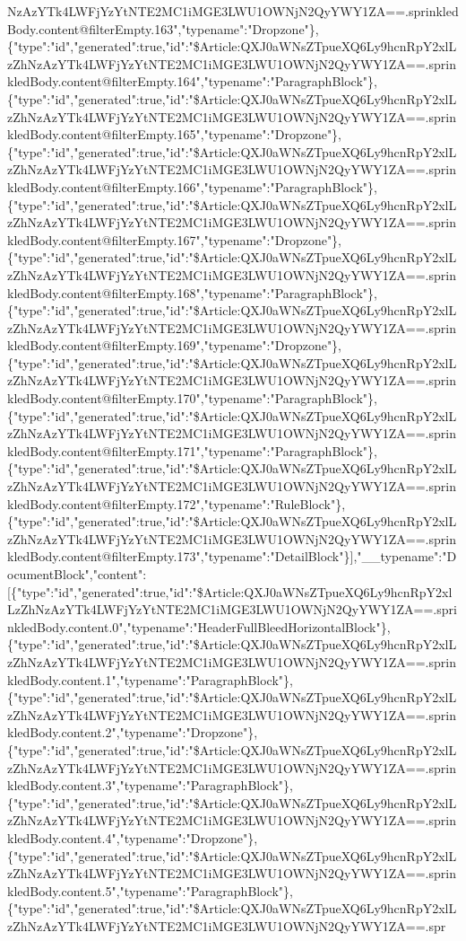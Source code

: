 NzAzYTk4LWFjYzYtNTE2MC1iMGE3LWU1OWNjN2QyYWY1ZA==.sprinkledBody.content@filterEmpty.163","typename":"Dropzone"\},\{"type":"id","generated":true,"id":"\$Article:QXJ0aWNsZTpueXQ6Ly9hcnRpY2xlLzZhNzAzYTk4LWFjYzYtNTE2MC1iMGE3LWU1OWNjN2QyYWY1ZA==.sprinkledBody.content@filterEmpty.164","typename":"ParagraphBlock"\},\{"type":"id","generated":true,"id":"\$Article:QXJ0aWNsZTpueXQ6Ly9hcnRpY2xlLzZhNzAzYTk4LWFjYzYtNTE2MC1iMGE3LWU1OWNjN2QyYWY1ZA==.sprinkledBody.content@filterEmpty.165","typename":"Dropzone"\},\{"type":"id","generated":true,"id":"\$Article:QXJ0aWNsZTpueXQ6Ly9hcnRpY2xlLzZhNzAzYTk4LWFjYzYtNTE2MC1iMGE3LWU1OWNjN2QyYWY1ZA==.sprinkledBody.content@filterEmpty.166","typename":"ParagraphBlock"\},\{"type":"id","generated":true,"id":"\$Article:QXJ0aWNsZTpueXQ6Ly9hcnRpY2xlLzZhNzAzYTk4LWFjYzYtNTE2MC1iMGE3LWU1OWNjN2QyYWY1ZA==.sprinkledBody.content@filterEmpty.167","typename":"Dropzone"\},\{"type":"id","generated":true,"id":"\$Article:QXJ0aWNsZTpueXQ6Ly9hcnRpY2xlLzZhNzAzYTk4LWFjYzYtNTE2MC1iMGE3LWU1OWNjN2QyYWY1ZA==.sprinkledBody.content@filterEmpty.168","typename":"ParagraphBlock"\},\{"type":"id","generated":true,"id":"\$Article:QXJ0aWNsZTpueXQ6Ly9hcnRpY2xlLzZhNzAzYTk4LWFjYzYtNTE2MC1iMGE3LWU1OWNjN2QyYWY1ZA==.sprinkledBody.content@filterEmpty.169","typename":"Dropzone"\},\{"type":"id","generated":true,"id":"\$Article:QXJ0aWNsZTpueXQ6Ly9hcnRpY2xlLzZhNzAzYTk4LWFjYzYtNTE2MC1iMGE3LWU1OWNjN2QyYWY1ZA==.sprinkledBody.content@filterEmpty.170","typename":"ParagraphBlock"\},\{"type":"id","generated":true,"id":"\$Article:QXJ0aWNsZTpueXQ6Ly9hcnRpY2xlLzZhNzAzYTk4LWFjYzYtNTE2MC1iMGE3LWU1OWNjN2QyYWY1ZA==.sprinkledBody.content@filterEmpty.171","typename":"ParagraphBlock"\},\{"type":"id","generated":true,"id":"\$Article:QXJ0aWNsZTpueXQ6Ly9hcnRpY2xlLzZhNzAzYTk4LWFjYzYtNTE2MC1iMGE3LWU1OWNjN2QyYWY1ZA==.sprinkledBody.content@filterEmpty.172","typename":"RuleBlock"\},\{"type":"id","generated":true,"id":"\$Article:QXJ0aWNsZTpueXQ6Ly9hcnRpY2xlLzZhNzAzYTk4LWFjYzYtNTE2MC1iMGE3LWU1OWNjN2QyYWY1ZA==.sprinkledBody.content@filterEmpty.173","typename":"DetailBlock"\}{]},"\_\_typename":"DocumentBlock","content":{[}\{"type":"id","generated":true,"id":"\$Article:QXJ0aWNsZTpueXQ6Ly9hcnRpY2xlLzZhNzAzYTk4LWFjYzYtNTE2MC1iMGE3LWU1OWNjN2QyYWY1ZA==.sprinkledBody.content.0","typename":"HeaderFullBleedHorizontalBlock"\},\{"type":"id","generated":true,"id":"\$Article:QXJ0aWNsZTpueXQ6Ly9hcnRpY2xlLzZhNzAzYTk4LWFjYzYtNTE2MC1iMGE3LWU1OWNjN2QyYWY1ZA==.sprinkledBody.content.1","typename":"ParagraphBlock"\},\{"type":"id","generated":true,"id":"\$Article:QXJ0aWNsZTpueXQ6Ly9hcnRpY2xlLzZhNzAzYTk4LWFjYzYtNTE2MC1iMGE3LWU1OWNjN2QyYWY1ZA==.sprinkledBody.content.2","typename":"Dropzone"\},\{"type":"id","generated":true,"id":"\$Article:QXJ0aWNsZTpueXQ6Ly9hcnRpY2xlLzZhNzAzYTk4LWFjYzYtNTE2MC1iMGE3LWU1OWNjN2QyYWY1ZA==.sprinkledBody.content.3","typename":"ParagraphBlock"\},\{"type":"id","generated":true,"id":"\$Article:QXJ0aWNsZTpueXQ6Ly9hcnRpY2xlLzZhNzAzYTk4LWFjYzYtNTE2MC1iMGE3LWU1OWNjN2QyYWY1ZA==.sprinkledBody.content.4","typename":"Dropzone"\},\{"type":"id","generated":true,"id":"\$Article:QXJ0aWNsZTpueXQ6Ly9hcnRpY2xlLzZhNzAzYTk4LWFjYzYtNTE2MC1iMGE3LWU1OWNjN2QyYWY1ZA==.sprinkledBody.content.5","typename":"ParagraphBlock"\},\{"type":"id","generated":true,"id":"\$Article:QXJ0aWNsZTpueXQ6Ly9hcnRpY2xlLzZhNzAzYTk4LWFjYzYtNTE2MC1iMGE3LWU1OWNjN2QyYWY1ZA==.spr